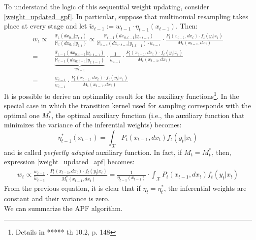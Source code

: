 \documentclass[
]{book}
\theoremstyle{break}
\theoremstyle{nonumberplain}
\begin{document}
To understand the logic of this sequential weight updating, consider
\eqref{weight_updated_gpf}. In particular, suppose that multinomial
resampling takes place at every stage and let
\(\tilde w_{t-1}:=w_{t-1}\cdot \eta_{t-1} (x_{t-1})\). Then:
\begin{equation}
    \begin{split}
        w_t\propto&\frac{\mathbb P_t(dx_{0:t}|y_{1:t})}{\mathbb M_t(dx_{0:t}|y_{1:t})}\propto \frac{\mathbb P_{t-1}(dx_{0:t-1}|y_{0:t-1})}{\mathbb M_{t-1}(dx_{0:t-1}|y_{1:t-1})\cdot \tilde w_{t-1}}\cdot\frac{P_t(x_{t-1},dx_t)\cdot f_t(y_t|x_t)}{ M_t(x_{t-1},dx_t)}\\
        =&\underbrace{\frac{\mathbb P_{t-1}(dx_{0:t-1}|y_{0:t-1})}{\mathbb M_{t-1}(dx_{0:t-1}|y_{1:t-1})}}_{w_{t-1}}\cdot\frac{1}{\tilde w_{t-1}}\cdot\frac{P_t(x_{t-1},dx_t)\cdot f_t(y_t|x_t)}{ M_t(x_{t-1},dx_t)}\\
        =&\frac{w_{t-1}}{ \tilde w_{t-1}}\cdot\frac{P_t(x_{t-1},dx_t)\cdot f_t(y_t|x_t)}{ M_t(x_{t-1},dx_t)}\label{weight_updated_apf}
    \end{split}
\end{equation} It is possible to derive an optimality result for the
auxiliary functions\footnote{Details in ***** th 10.2, p. 148}. In the
special case in which the transition kernel used for sampling
corresponds with the optimal one \(M_t^*\), the optimal auxiliary
function (i.e., the auxiliary function that minimizes the variance of
the inferential weights) becomes: \begin{equation}
    \eta_{t-1}^*(x_{t-1})=\int_\mathcal XP_t(x_{t-1},dx_t)f_t(y_t|x_t)
\end{equation} and is called \textit{perfectly adapted} auxiliary
function. In fact, if \(M_t=M_t^*\), then, expression
\eqref{weight_updated_apf} becomes: \begin{equation*}
    \begin{split}
        w_t\propto\frac{w_{t-1}}{ \tilde w_{t-1}}\cdot\frac{P_t(x_{t-1},dx_t)\cdot f_t(y_t|x_t)}{ M_t^*(x_{t-1},dx_t)}=\frac{1}{\eta_{t-1} (x_{t-1})}\cdot\int_\mathcal XP_t(x_{t-1},dx_t)f_t(y_t|x_t)
    \end{split}
\end{equation*} From the previous equation, it is clear that if
\(\eta_t=\eta_t^*\), the inferential weights are constant and their
variance is zero.\\
We can summarize the APF algorithm.
\end{document}
